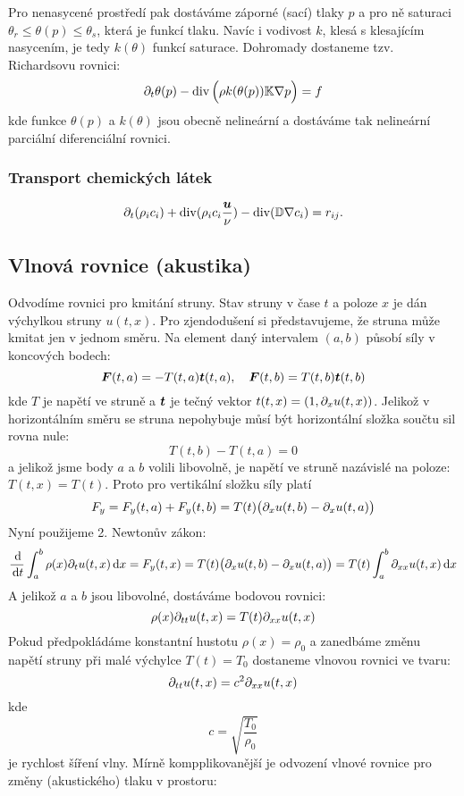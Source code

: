 Pro nenasycené prostředí pak dostáváme záporné (sací) tlaky $p$ a pro ně saturaci $\theta_r \le \theta(p) \le \theta_s$, která je funkcí tlaku. 
Navíc i vodivost $k$, klesá s klesajícím nasycením, je tedy $k(\theta)$ funkcí saturace. Dohromady dostaneme tzv. Richardsovu rovnici:
\[
    \partial_t \theta(p) -\operatorname{div}\Big( \rho k(\theta(p)) {\mathbb{K}} \nabla p\Big) = f
\]
kde funkce $\theta(p)$ a $k(\theta)$ jsou obecně nelineární a dostáváme tak nelineární parciální diferenciální rovnici.



\subsubsection{Transport chemických látek}
\begin{equation}
    \partial_t (\rho_i c_i) + \operatorname{div} (\rho_i c_i \frac{\mathbf{\boldsymbol{u}}}{\nu}) - \operatorname{div}( {\mathbb{D}} \nabla c_i) = r_{ij}.
\end{equation}


\subsection{Vlnová rovnice (akustika)}

Odvodíme rovnici pro kmitání struny. Stav struny v čase $t$ a poloze $x$ je dán výchylkou struny $u(t,x)$. Pro zjendodušení si představujeme, 
že struna může kmitat jen v jednom směru. Na element daný intervalem $(a,b)$ působí síly v koncových bodech:
\[
    \mathbf{\boldsymbol{F}}(t,a) = -T(t,a) \mathbf{\boldsymbol{t}}(t,a),\quad \mathbf{\boldsymbol{F}}(t,b) = T(t,b) \mathbf{\boldsymbol{t}}(t, b)
\]
kde $T$ je napětí ve struně a $\mathbf{\boldsymbol{t}}$ je tečný vektor $ t(t, x) = ( 1, \partial_x u(t,x) )$. 
Jelikož v horizontálním směru se struna nepohybuje můsí být horizontální složka součtu sil rovna nule:
\[
    T(t,b) - T(t,a) = 0
\]
a jelikož jsme body $a$ a $b$ volili libovolně,  je napětí ve struně nazávislé na poloze: $T(t, x) = T(t)$.
Proto pro vertikální složku síly platí 
\[
    F_y = F_y(t,a) + F_y(t,b) = T(t)\big(\partial_x u(t,b) - \partial_x u(t,a)\big)
\]
Nyní použijeme 2. Newtonův zákon:
\[
    \frac{\,{\rm d}}{\,{\rm d}{t}} \int_a^b \rho(x) \partial_t u(t,x) \,{\rm d} x = F_y(t,x) = T(t)\big(\partial_x u(t,b) - \partial_x u(t,a)\big) = T(t) \int_a^b \partial_{xx} u(t,x) \,{\rm d} x 
\]
A jelikož $a$ a $b$ jsou libovolné, dostáváme bodovou rovnici:
\[
    \rho(x) \partial_{tt} u(t,x) = T(t) \partial_{xx} u(t,x) 
\]
Pokud předpokládáme konstantní hustotu $\rho(x) = \rho_0$ a zanedbáme změnu napětí struny při malé výchylce $T(t)=T_0$ dostaneme vlnovou rovnici ve tvaru:
\[
    \partial_{tt} u(t,x) = c^2 \partial_{xx} u(t,x)
\]
kde 
\[
    c=\sqrt{\frac{T_0}{\rho_0}}
\]
je rychlost šíření vlny. 
Mírně kompplikovanější je odvození vlnové rovnice pro změny (akustického) tlaku v prostoru:


